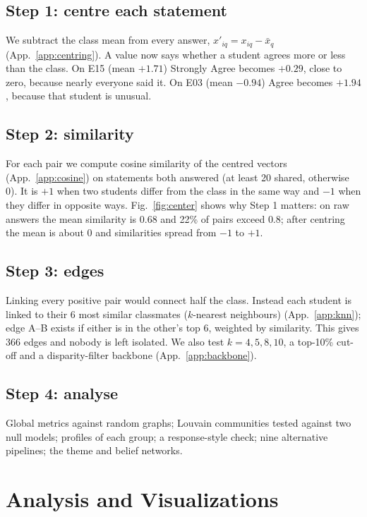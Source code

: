 \documentclass[10pt,a4paper]{article}
\newcommand{\app}[1]{(App.~\ref{app:#1})}\setlength{\columnsep}{14pt}
\begin{document}
\subsection{Step 1: centre each statement}
We subtract the class mean from every answer, $x'_{iq} = x_{iq}-\bar x_q$ \app{centring}. A value now says whether a student agrees more or less than the class. On E15 (mean $+1.71$) Strongly Agree becomes $+0.29$, close to zero, because nearly everyone said it. On E03 (mean $-0.94$) Agree becomes $+1.94$, because that student is unusual.

\subsection{Step 2: similarity}
For each pair we compute cosine similarity of the centred vectors \app{cosine} on statements both answered (at least 20 shared, otherwise 0). It is $+1$ when two students differ from the class in the same way and $-1$ when they differ in opposite ways. Fig.~\ref{fig:center} shows why Step 1 matters: on raw answers the mean similarity is $0.68$ and 22\% of pairs exceed $0.8$; after centring the mean is about 0 and similarities spread from $-1$ to $+1$.

\subsection{Step 3: edges}
Linking every positive pair would connect half the class. Instead each student is linked to their 6 most similar classmates ($k$-nearest neighbours) \app{knn}; edge A--B exists if either is in the other's top 6, weighted by similarity. This gives 366 edges and nobody is left isolated. We also test $k=4,5,8,10$, a top-10\% cut-off and a disparity-filter backbone \app{backbone}.

\subsection{Step 4: analyse}
Global metrics against random graphs; Louvain communities tested against two null models; profiles of each group; a response-style check; nine alternative pipelines; the theme and belief networks.

\section{Analysis and Visualizations}
\end{document}
